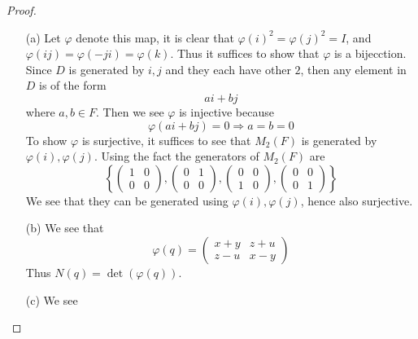 \documentclass[openany]{book}
\begin{document}
\begin{proof}
    \begin{itemize}
        \item[(a)] Let $\varphi$ denote this map, it is clear that $\varphi(i)^2=\varphi(j)^2=I$, and $\varphi(ij)=\varphi(-ji)=\varphi(k)$. Thus it suffices to show that $\varphi$ is a bijecction. Since $D$ is generated by $i,j$ and they each have other $2$, then any element in $D$ is of the form 
        \begin{equation*}
            ai+bj
        \end{equation*}
        where $a,b\in F$. Then we see $\varphi$ is injective because 
        \begin{equation*}
            \varphi(ai+bj)=0\Rightarrow a=b=0
        \end{equation*}
        To show $\varphi$ is surjective, it suffices to see that $M_2(F)$ is generated by $\varphi(i),\varphi(j)$. Using the fact the generators of $M_2(F)$ are 
        \begin{equation*}
            \left\{\begin{pmatrix}
                1&0\\
                0&0
            \end{pmatrix}, \begin{pmatrix}
                0&1\\
                0&0
            \end{pmatrix}, \begin{pmatrix}
                0&0\\
                1&0
            \end{pmatrix}, \begin{pmatrix}
                0&0\\
                0&1
            \end{pmatrix}\right\}
        \end{equation*}
        We see that they can be generated using $\varphi(i),\varphi(j)$, hence also surjective. 
        \item[(b)] We see that 
        \begin{equation*}
            \varphi(q)=\begin{pmatrix}
                x+y&z+u\\
                z-u&x-y
            \end{pmatrix}
        \end{equation*}
        Thus $N(q)=\det(\varphi(q))$.
        \item[(c)] We see 

\end{itemize}
\end{proof}
\end{document}
